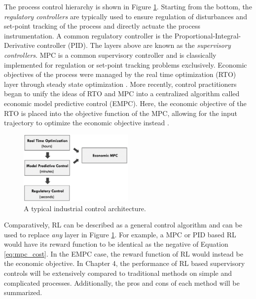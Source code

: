 The process control hierarchy is shown in Figure \ref{fig:rto_mpc_pid}. Starting from the bottom, the \textit{regulatory controllers} are typically used to ensure regulation of disturbances and set-point tracking of the process and directly actuate the process instrumentation.  A common regulatory controller is the Proportional-Integral-Derivative controller (PID). The layers above are known as the \textit{supervisory controllers}. MPC is a common supervisory controller and is classically implemented for regulation or set-point tracking problems exclusively.  Economic objectives of the process were managed by the real time optimization (RTO) layer through steady state optimization \cite{rto}. More recently, control practitioners began to unify the ideas of RTO and MPC into a centralized algorithm called economic model predictive control (EMPC).  Here, the economic objective of the RTO is placed into the objective function of the MPC, allowing for the input trajectory to optimize the economic objective instead \cite{empc2, empc1}. 

\begin{figure}[H]
    \centering
    \includegraphics[width=0.5\textwidth]{images/ch1/rto_mpc_pid.jpeg}
    \caption{A typical industrial control architecture.}
    \label{fig:rto_mpc_pid}
\end{figure}

Comparatively, RL can be described as a general control algorithm and can be used to replace \textit{any} layer in Figure \ref{fig:rto_mpc_pid}. For example, a MPC or PID based RL would have its reward function to be identical as the negative of Equation \ref{eq:mpc_cost}.  In the EMPC case, the reward function of RL would instead be the economic objective.  In Chapter 4, the performance of RL based supervisory controls will be extensively compared to traditional methods on simple and complicated processes. Additionally, the pros and cons of each method will be summarized.
